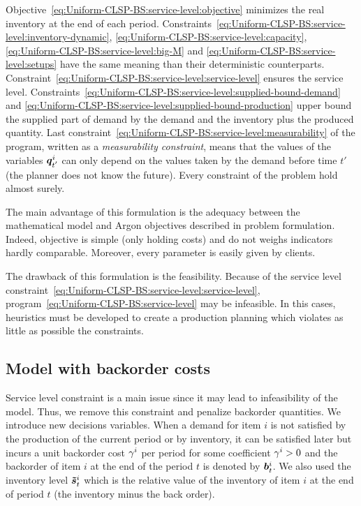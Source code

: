 Objective~\eqref{eq:Uniform-CLSP-BS:service-level:objective} minimizes the real inventory at the end of each period.
Constraints~\eqref{eq:Uniform-CLSP-BS:service-level:inventory-dynamic}, \eqref{eq:Uniform-CLSP-BS:service-level:capacity}, \eqref{eq:Uniform-CLSP-BS:service-level:big-M} and \eqref{eq:Uniform-CLSP-BS:service-level:setups} have the same meaning than their deterministic counterparts.
Constraint~\eqref{eq:Uniform-CLSP-BS:service-level:service-level} ensures the service level.
Constraints~\eqref{eq:Uniform-CLSP-BS:service-level:supplied-bound-demand} and \eqref{eq:Uniform-CLSP-BS:service-level:supplied-bound-production} upper bound the supplied part of demand by the demand and the inventory plus the produced quantity.
Last constraint~\eqref{eq:Uniform-CLSP-BS:service-level:measurability} of the program, written as a {\em measurability constraint}, means that the values of the variables $\va\quantity_{t'}^i$ can only depend on the values taken by the demand before time $t'$ (the planner does not know the future).
Every constraint of the problem hold almost surely.


The main advantage of this formulation is the adequacy between the mathematical model and Argon objectives described in problem formulation. Indeed, objective is simple (only holding costs) and do not weighs indicators hardly comparable. Moreover, every parameter is easily given by clients.

The drawback of this formulation is the feasibility. Because of the service level constraint~\eqref{eq:Uniform-CLSP-BS:service-level:service-level}, program~\eqref{eq:Uniform-CLSP-BS:service-level} may be infeasible. In this cases, heuristics must be developed to create a production planning which violates as little as possible the constraints.



\subsection{Model with backorder costs}


Service level constraint is a main issue since it may lead to infeasibility of the model. Thus, we remove this constraint and penalize backorder quantities. We introduce new decisions variables. When a demand for item $i$ is not satisfied by the production of the current period or by inventory, it can be satisfied later but incurs a unit backorder cost $\gamma^i$ per period for some coefficient $\gamma^i>0$ and the backorder of item $i$ at the end of the period $t$ is denoted by $\va\backlog_t^i$. We also used the inventory level $\va\level_t^i$ which is the relative value of the inventory of item $i$ at the end of period $t$ (\ie the inventory minus the back order).

